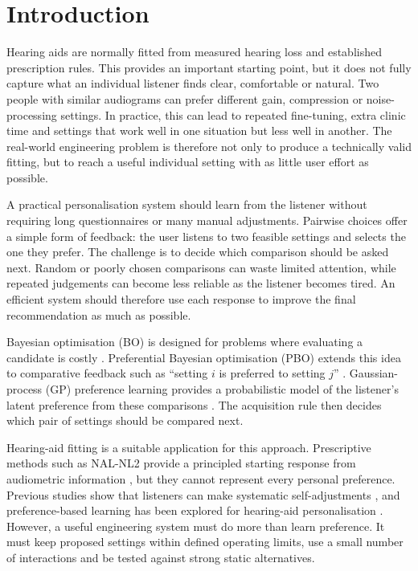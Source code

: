\documentclass[preprint,12pt]{elsarticle}
\begin{document}
\section{Introduction}
\label{sec:introduction}

Hearing aids are normally fitted from measured hearing loss and established prescription rules. This provides an important starting point, but it does not fully capture what an individual listener finds clear, comfortable or natural. Two people with similar audiograms can prefer different gain, compression or noise-processing settings. In practice, this can lead to repeated fine-tuning, extra clinic time and settings that work well in one situation but less well in another. The real-world engineering problem is therefore not only to produce a technically valid fitting, but to reach a useful individual setting with as little user effort as possible.

A practical personalisation system should learn from the listener without requiring long questionnaires or many manual adjustments. Pairwise choices offer a simple form of feedback: the user listens to two feasible settings and selects the one they prefer. The challenge is to decide which comparison should be asked next. Random or poorly chosen comparisons can waste limited attention, while repeated judgements can become less reliable as the listener becomes tired. An efficient system should therefore use each response to improve the final recommendation as much as possible.

Bayesian optimisation (BO) is designed for problems where evaluating a candidate is costly \cite{shahriari2016}. Preferential Bayesian optimisation (PBO) extends this idea to comparative feedback such as ``setting $i$ is preferred to setting $j$'' \cite{gonzalez2017}. Gaussian-process (GP) preference learning provides a probabilistic model of the listener's latent preference from these comparisons \cite{chu2005,rasmussen2006}. The acquisition rule then decides which pair of settings should be compared next.

Hearing-aid fitting is a suitable application for this approach. Prescriptive methods such as NAL-NL2 provide a principled starting response from audiometric information \cite{keidser2011}, but they cannot represent every personal preference. Previous studies show that listeners can make systematic self-adjustments \cite{dreschler2008,boothroyd2017,mackersie2019,sabin2020}, and preference-based learning has been explored for hearing-aid personalisation \cite{birlutiu2010,nielsen2015,vyas2022,akbarzadeh2022,ni2024}. However, a useful engineering system must do more than learn preference. It must keep proposed settings within defined operating limits, use a small number of interactions and be tested against strong static alternatives.
\end{document}
